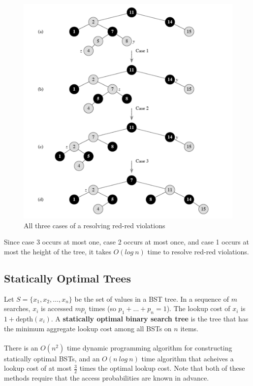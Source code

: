 \documentclass{article}
\theoremstyle{plain}
\theoremstyle{definition}
\begin{document}
            \begin{figure}
                \centering
                \includegraphics[width=\linewidth]{images/redblack.png}
                \caption{All three cases of a resolving red-red violations}
                \label{fig:redblack}
            \end{figure}

            Since case 3 occurs at most one, case 2 occurs at most once, and case 1 occurs at most the height of the tree, it takes $O(log \ n)$ time to resolve red-red violations. 
    \subsection{Statically Optimal Trees}

    Let $S = \{ x_1, x_2, \ldots, x_n \}$ be the set of values in a BST tree. In a sequence of $m$ searches, $x_i$ is accessed $mp_i$ times (so $p_1 + \ldots + p_n = 1$). The lookup cost of $x_i$ is $1 + \text{depth}(x_i)$. A \textbf{statically optimal binary search tree} is the tree that has the minimum aggregate lookup cost among all BSTs on $n$ items. \\ \\
    There is an $O(n^2)$ time dynamic programming algorithm for constructing statically optimal BSTs, and an $O(n \ log \ n)$ time algorithm that acheives a lookup cost of at most $\frac{3}{2}$ times the optimal lookup cost. Note that both of these methods require that the access probabilities are known in advance. 
\end{document}
